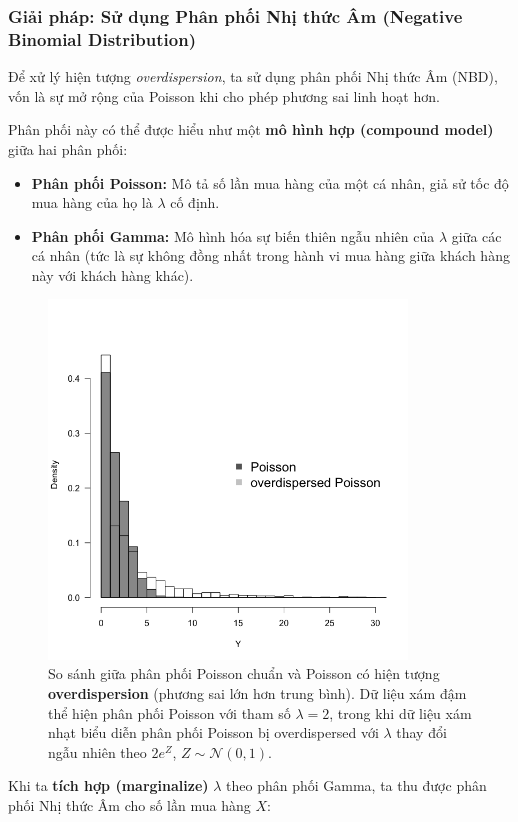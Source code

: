 \subsubsection*{Giải pháp: Sử dụng Phân phối Nhị thức Âm (Negative Binomial Distribution)}

Để xử lý hiện tượng \textit{overdispersion}, ta sử dụng phân phối Nhị thức Âm (NBD),
vốn là sự mở rộng của Poisson khi cho phép phương sai linh hoạt hơn.  

Phân phối này có thể được hiểu như một \textbf{mô hình hợp (compound model)} giữa hai phân phối:

\begin{itemize}
    \item \textbf{Phân phối Poisson:} Mô tả số lần mua hàng của một cá nhân, giả sử tốc độ mua hàng của họ là $\lambda$ cố định.
    \item \textbf{Phân phối Gamma:} Mô hình hóa sự biến thiên ngẫu nhiên của $\lambda$ giữa các cá nhân (tức là sự không đồng nhất trong hành vi mua hàng giữa khách hàng này với khách hàng khác).
\end{itemize}

\begin{figure}[h!]
    \centering
    \includegraphics[width=0.85\textwidth]{images/Overdispersion_pois.png}
    \caption{So sánh giữa phân phối Poisson chuẩn và Poisson có hiện tượng \textbf{overdispersion} (phương sai lớn hơn trung bình). 
    Dữ liệu xám đậm thể hiện phân phối Poisson với tham số $\lambda = 2$, 
    trong khi dữ liệu xám nhạt biểu diễn phân phối Poisson bị overdispersed với $\lambda$ thay đổi ngẫu nhiên theo $2 e^{Z}$, $Z \sim \mathcal{N}(0, 1)$.}
    \label{fig:poisson_overdispersion}
\end{figure}
Khi ta \textbf{tích hợp (marginalize)} $\lambda$ theo phân phối Gamma, 
ta thu được phân phối Nhị thức Âm cho số lần mua hàng $X$:

